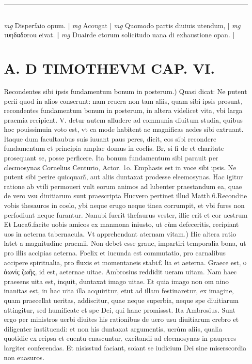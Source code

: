 \documentclass{article}
\begin{document}
\begin{pages}
\vspace{0.5cm}\noindent
\vspace{0.2cm}\rule{1cm}{0.2pt}\\ 
\hspace{0.2cm}\textit{mg}
\footnotesize Disperfaio opum. 
\normalsize| 
\hspace{0.2cm}\textit{mg}
\footnotesize Acougat 
\normalsize| 
\hspace{0.2cm}\textit{mg}
\footnotesize Quomodo partis diuiuis utendum, 
\normalsize| 
\hspace{0.2cm}\textit{mg}
\footnotesize τυηδαδοrou eivat. 
\normalsize| 
\hspace{0.2cm}\textit{mg}
\footnotesize Duairde ctorum solicitudo uana di exhaustione opan. 
\normalsize| 
\section*{A. D TIMOTHEVM CAP. VI. }
\marginpar{[ p.133 ]}\pstart Recondentes sibi ipsis fundamentum bonum in posterum.) Quasi dicat: Ne putent perii quod in alios conserunt: nam reuera non tam aliis, quam sibi ipsis prosunt, recondentes fundamentum bonum in posterum, in altera videlicet vita, vbi larga praemia recipient. V. detur autem alludere ad communia diuitum studia, quibus hoc pouissimuin voto est, vt ca mode habitent ac magnificas aedes sibi extruant. Itaque dum facultaubus suis iuuant paus peres, dicit, eos sibi recondere fundamentum et principia amplae domus in coelis. Br, si fi de et charitate prosequant se, posse perficere. Ita bonum fundamentum sibi parauit per clecmosynas Cornelius Centurio, Actor. 1o. Emphasis est in voce sibi ipsis. Ne putent sibi perire quicquam̃, aut aliis duntaxat prodesse eleemosynas. Hac igitur ratione ab vtili permoueri vult eorum animos ad lubenter praestandum ea, quae de vero vsu diuitiarum sunt praescripta Hucvero pertinet illud Matth.6.Recondite vobis thesauros in coelo, ybi neque erugo neque tinea corrumpit, et vbi fures non perfodiunt neque furantur. Nanubi fuerit thefaurus vester, illic erit et cor uestrum Et Luca6.facite uobis amicos ex manmona iniusto, ut cùm defeceritis, recipiant uos in aeterna tabernacula.  \pend\pstart Vt apprehendant aternam vitam.) Hic altera ratio latet a magnitudine praemii. Non debet esse graue, impartiri temporalia bona, ut pro illis accipias aeterna. Foelix et iucunda est commutatio, pro carnalibus accipere spiritualia, pro fluxis et momentaneis stabi£ lia et aeterna. Graece est, ο ἀωνίς ζωῆς, id est, aeternae uitae. Ambrosius reddidit ueram uitam. Nam haec praesens uita est, inquit, duntaxat imago uitae. Et quia imago non om nino inanitas est, in hac uita illa acquiritur, etut ad illam festinaretur, ex imagine, quam praecellat ueritas, addiscitur, quae neque superbia, neque spe diuitiarum attingitur, sed humilicate et spe Dei, qui hanc promissst. Ita Ambrosius. Sunt ergo per ministros uerbi diuites his rationibus de uero usu diuitiarum crebro et diligenter instituendi: et non his duntaxat argumentis, uerùm aliis, qualia quotidie ex reipsa et euentu enascuntur, excitandi ad eleemosynas in pauperes largiter conferendas. Et nisisstud faciant, soiant se iudicium Dei sine miserscordia non euasuros.  \pend

\end{pages}
\end{document}
